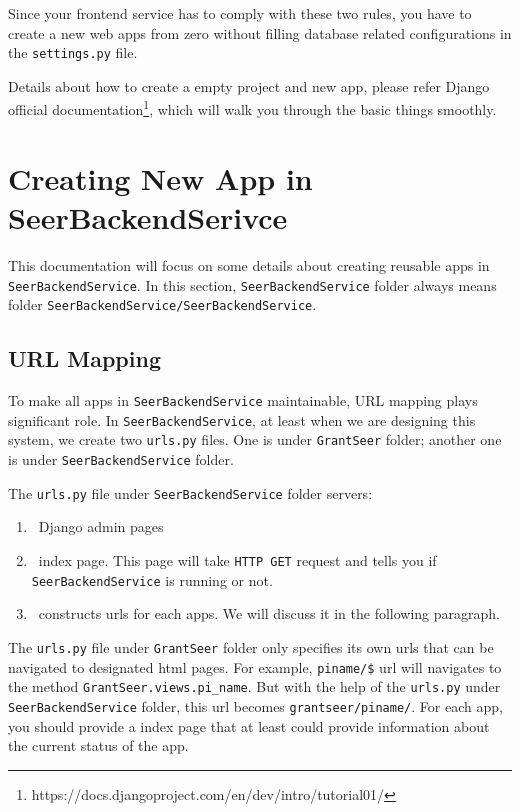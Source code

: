\documentclass[12pt]{article}
\begin{document}
Since your frontend service has to comply with these two rules, you have to create a new web apps from zero without filling database related configurations in the \texttt{settings.py} file.

Details about how to create a empty project and new app, please refer Django official documentation\footnote{https://docs.djangoproject.com/en/dev/intro/tutorial01/}, which will walk you through the basic things smoothly.

\section{Creating New App in SeerBackendSerivce}
This documentation will focus on some details about creating reusable apps in \texttt{SeerBackendService}. In this section, \texttt{SeerBackendService} folder always means folder \texttt{SeerBackendService/SeerBackendService}.

\subsection*{URL Mapping}
To make all apps in \texttt{SeerBackendService} maintainable, URL mapping plays significant role. In \texttt{SeerBackendService}, at least when we are designing this system, we create two \texttt{urls.py} files. One is under \texttt{GrantSeer} folder; another one is under \texttt{SeerBackendService} folder.

The \texttt{urls.py} file under \texttt{SeerBackendService} folder servers:
\begin{enumerate}
	\item\ Django admin pages
	\item\ index page. This page will take \texttt{HTTP GET} request and tells you if \texttt{SeerBackendService} is running or not.
	\item\ constructs urls for each apps. We will discuss it in the following paragraph.
\end{enumerate}

The \texttt{urls.py} file under \texttt{GrantSeer} folder only specifies its own urls that can be navigated to designated html pages. For example, \texttt{piname/\$} url will navigates to the method \texttt{GrantSeer.views.pi\_name}. But with the help of the \texttt{urls.py} under \texttt{SeerBackendService} folder, this url becomes \texttt{grantseer/piname/}. For each app, you should provide a index page that at least could provide information about the current status of the app.
\end{document}
